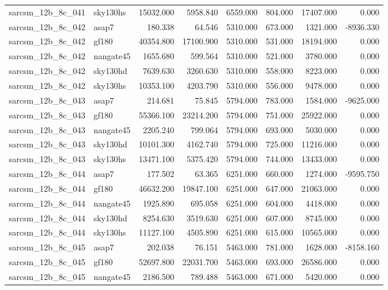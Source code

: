 \begin{tabular}{llrrrrrr}
sarcsm\_12b\_8c\_041 & sky130hs & 15032.000 & 5958.840 & 6559.000 & 804.000 & 17407.000 & 0.000 \\
sarcsm\_12b\_8c\_042 & asap7 & 180.338 & 64.546 & 5310.000 & 673.000 & 1321.000 & -8936.330 \\
sarcsm\_12b\_8c\_042 & gf180 & 40354.800 & 17100.900 & 5310.000 & 531.000 & 18194.000 & 0.000 \\
sarcsm\_12b\_8c\_042 & nangate45 & 1655.680 & 599.564 & 5310.000 & 521.000 & 3780.000 & 0.000 \\
sarcsm\_12b\_8c\_042 & sky130hd & 7639.630 & 3260.630 & 5310.000 & 558.000 & 8223.000 & 0.000 \\
sarcsm\_12b\_8c\_042 & sky130hs & 10353.100 & 4203.790 & 5310.000 & 556.000 & 9478.000 & 0.000 \\
sarcsm\_12b\_8c\_043 & asap7 & 214.681 & 75.845 & 5794.000 & 783.000 & 1584.000 & -9625.000 \\
sarcsm\_12b\_8c\_043 & gf180 & 55366.100 & 23214.200 & 5794.000 & 751.000 & 25922.000 & 0.000 \\
sarcsm\_12b\_8c\_043 & nangate45 & 2205.240 & 799.064 & 5794.000 & 693.000 & 5030.000 & 0.000 \\
sarcsm\_12b\_8c\_043 & sky130hd & 10101.300 & 4162.740 & 5794.000 & 725.000 & 11216.000 & 0.000 \\
sarcsm\_12b\_8c\_043 & sky130hs & 13471.100 & 5375.420 & 5794.000 & 744.000 & 13433.000 & 0.000 \\
sarcsm\_12b\_8c\_044 & asap7 & 177.502 & 63.365 & 6251.000 & 660.000 & 1274.000 & -9595.750 \\
sarcsm\_12b\_8c\_044 & gf180 & 46632.200 & 19847.100 & 6251.000 & 647.000 & 21063.000 & 0.000 \\
sarcsm\_12b\_8c\_044 & nangate45 & 1925.890 & 695.058 & 6251.000 & 604.000 & 4418.000 & 0.000 \\
sarcsm\_12b\_8c\_044 & sky130hd & 8254.630 & 3519.630 & 6251.000 & 607.000 & 8745.000 & 0.000 \\
sarcsm\_12b\_8c\_044 & sky130hs & 11127.100 & 4505.890 & 6251.000 & 615.000 & 10565.000 & 0.000 \\
sarcsm\_12b\_8c\_045 & asap7 & 202.038 & 76.151 & 5463.000 & 781.000 & 1628.000 & -8158.160 \\
sarcsm\_12b\_8c\_045 & gf180 & 52697.800 & 22031.700 & 5463.000 & 693.000 & 26586.000 & 0.000 \\
sarcsm\_12b\_8c\_045 & nangate45 & 2186.500 & 789.488 & 5463.000 & 671.000 & 5420.000 & 0.000 \\

\end{tabular}
